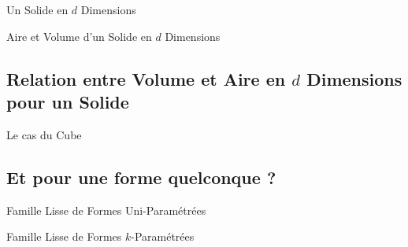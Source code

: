 \documentclass{beamercours}
\begin{document}
            \begin{frame}{Un Solide en $d$ Dimensions}
                
            \end{frame}

            \begin{frame}{Aire et Volume d'un Solide en $d$ Dimensions}
                
            \end{frame}

        \subsection{Relation entre Volume et Aire en $d$ Dimensions pour un Solide}
            \begin{frame}{Le cas du Cube}
                
            \end{frame}


        \subsection{Et pour une forme quelconque ?}
            \begin{frame}{Famille Lisse de Formes Uni-Paramétrées}
                
            \end{frame}

            \begin{frame}{Famille Lisse de Formes $k$-Paramétrées}
                
            \end{frame}
\end{document}
